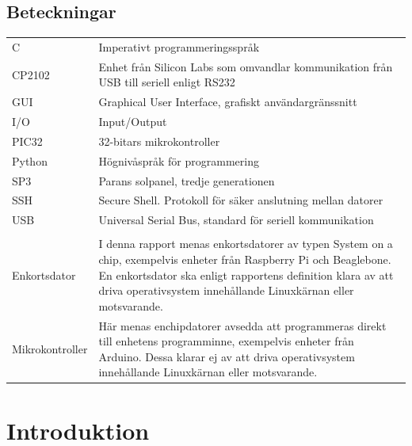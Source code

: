 \documentclass{article}
\begin{document}
    \subsection*{Beteckningar} %
    \label{sub:beteckningar}
        \begin{tabularx}{\textwidth}{@{}lX}
            C & Imperativt programmeringsspråk \\
            CP2102 & Enhet från Silicon Labs som omvandlar kommunikation från
            USB till seriell enligt RS232\\
            GUI & Graphical User Interface, grafiskt användargränssnitt \\
            I/O & Input/Output \\
            PIC32 & 32-bitars mikrokontroller \\
            Python & Högnivåspråk för programmering \\
            SP3 & Parans solpanel, tredje generationen \\
            SSH & Secure Shell. Protokoll för säker anslutning mellan datorer\\
            USB & Universal Serial Bus, standard för seriell kommunikation \\
            \\
            Enkortsdator & I denna rapport menas enkortsdatorer av typen System
            on a chip, exempelvis enheter från Raspberry Pi och Beagle\-bone. 
            En enkortsdator ska enligt rapportens definition klara av att driva 
            operativsystem innehållande Linuxkärnan eller mot\-svarande. \\
            Mikrokontroller & Här menas enchipdatorer avsedda att programmeras 
            direkt till enhetens programminne, exempelvis enheter från 
            \hbox{Arduino}. Dessa klarar ej av att driva operativsystem 
            innehållande Linux\-kärnan eller motsvarande.\\
            

        \end{tabularx}
    \newpage

    \tableofcontents
    \listoffigures

    \newpage

    \section{Introduktion} %
    \label{sec:introduktion}
\end{document}
